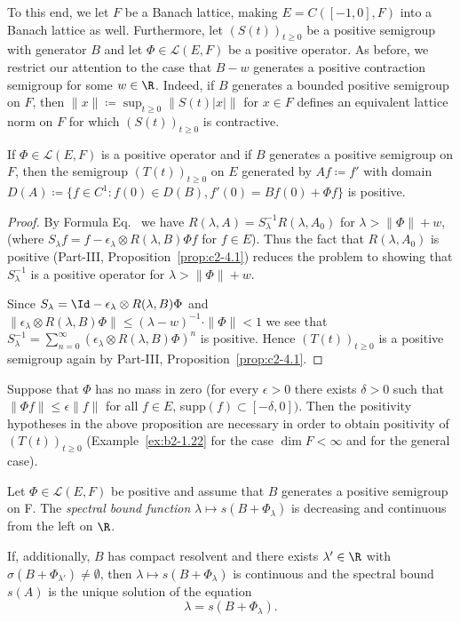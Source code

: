 To this end, we let $F$ be a Banach lattice, making $E = C([-1,0],F)$ into a Banach lattice as well. 
Furthermore, let $(S(t))_{t \geq 0}$ be a positive semigroup with generator $B$ and let $\Phi \in \mathcal{L}(E,F)$ be a positive operator. 
As before, we restrict our attention to the case that $B - w$ generates a positive contraction semigroup for some $w \in \R$. 
Indeed, if\/ $B$ generates a bounded positive semigroup on $F$, then $\|x\|  \coloneq  \sup_{t \geq 0}\|S(t)|x|\|$ for $x \in F$ defines an equivalent lattice norm on $F$ for which $(S(t))_{t \geq 0}$ is contractive.
\begin{proposition}\label{prop:b4-3.5}
	If\/ $\Phi \in \mathcal{L}(E,F)$ is a positive operator and if\/ $B$ generates a positive semigroup on $F$, then the semigroup $(T(t))_{t \geq 0}$ on $E$ generated by $Af  \coloneq  f'$ with domain $D(A)  \coloneq  \{f \in C^1 \colon f(0) \in D(B), f'(0) = Bf(0) + \Phi f\}$ is positive.
\end{proposition}
\begin{proof} By Formula Eq.~ we have $R(\lambda,A) = S_\lambda^{-1}R(\lambda,A_{0})$ for $\lambda > \|\Phi\|+w$, (where $S_\lambda f = f - \epsilon_\lambda \otimes R(\lambda,B)\Phi f$ for $f \in E$). 
Thus the fact that $R(\lambda,A_{0})$ is positive (Part-III, Proposition~\ref{prop:c2-4.1}) reduces the problem to showing that $S_\lambda^{-1}$ is a positive operator for $\lambda > \|\Phi\|+w$.

Since $S_\lambda = \Id  - \epsilon_\lambda \otimes R(\lambda,B)\Phi$ and $\|\epsilon_\lambda \otimes R(\lambda,B)\Phi\| \leq (\lambda-w)^{-1} \cdot \|\Phi\| < 1$ we see that $S_\lambda^{-1} = \sum_{n=0}^{\infty}(\epsilon_\lambda \otimes R(\lambda,B)\Phi)^n$ is positive. 
Hence $(T(t))_{t \geq 0}$ is a positive semigroup again by Part-III, Proposition~\ref{prop:c2-4.1}.
\end{proof}
\begin{remark*}
Suppose that $\Phi$ has no mass in zero (\ie  for every $\epsilon > 0$ there exists $\delta > 0$ such that $\|\Phi f\| \leq \epsilon \|f\|$ for all $f \in E$, supp$(f) \subset [-\delta,0])$. 
Then the positivity hypotheses in the above proposition are necessary in order to obtain positivity of\/ $(T(t))_{t \geq 0}$ (\cf Example~\ref{ex:b2-1.22} for the case $\dim F < \infty$ and \textcite{kerscher:1986} for the general case).
\end{remark*}
\begin{proposition}\label{prop:b4-3.6}
	Let $\Phi \in \mathcal{L}(E,F)$ be positive and assume that $B$ generates a positive semigroup on F. 
    The \emph{spectral bound function} $\lambda \mapsto s(B + \Phi_\lambda)$ is decreasing and continuous from the left on $\R$.
	
	If, additionally, $B$ has compact resolvent and there exists $\lambda' \in \R$ with $\sigma(B + \Phi_{\lambda'}) \neq \emptyset$, then $\lambda \mapsto s(B + \Phi_\lambda)$ is continuous and the spectral bound $s(A)$ is the unique solution of the equation
	\begin{equation}\label{eq:b4-3.5}
		\lambda = s(B + \Phi_\lambda) .
	\end{equation}
\end{proposition}
